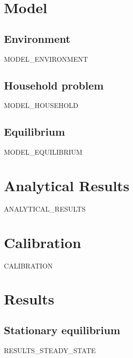 \section{Model}
\label{sec:model}
\subsection{Environment}
{{MODEL_ENVIRONMENT}}
\subsection{Household problem}
{{MODEL_HOUSEHOLD}}
\subsection{Equilibrium}
{{MODEL_EQUILIBRIUM}}

\section{Analytical Results}
\label{sec:analytical}
{{ANALYTICAL_RESULTS}}

\section{Calibration}
\label{sec:calibration}
{{CALIBRATION}}

\section{Results}
\label{sec:results}
\subsection{Stationary equilibrium}
{{RESULTS_STEADY_STATE}}
